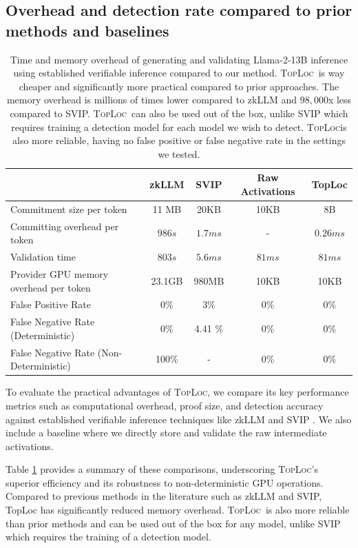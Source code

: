 \documentclass{article}
\theoremstyle{plain}
\theoremstyle{definition}
\theoremstyle{remark}
\newcommand{\toploc}{\textsc{TopLoc}}
\begin{document}
\subsection{Overhead and detection rate compared to prior methods and baselines}
\begin{table}[ht]
\caption{
Time and memory overhead of generating and validating Llama-2-13B inference using established verifiable inference compared to our method.
\toploc \ is way cheaper and significantly more practical compared to prior approaches.
The memory overhead is millions of times lower compared to zkLLM and $98,000$x less compared to SVIP.
\toploc \ can also be used out of the box, unlike SVIP which requires training a detection model for each model we wish to detect.
\toploc is also more reliable, having no false positive or false negative rate in the settings we tested.
}
\label{tab:comparisons}
\vskip 0.15in
\begin{center}
\begin{tabular}{lcccc}
 \toprule
  & zkLLM & SVIP & Raw Activations & TopLoc \\
 \midrule
 Commitment size per token & 11 MB & 20KB & 10KB & 8B \\ 
Committing overhead per token & $986s$ & $1.7ms$ & - & $0.26ms$ \\ 
Validation time & $803s$ & $5.6ms$ & $81ms$ & $81ms$\\ 
Provider GPU memory overhead per token & 23.1GB & 980MB & 10KB & 10KB\\ 
False Positive Rate & 0\% & 3\% & 0\% & 0\% \\
False Negative Rate (Deterministic) & 0\% & 4.41 \% & 0\% & 0\% \\ 
False Negative Rate (Non-Deterministic) & 100\% & - & 0\% & 0\% \\ 
\bottomrule
\end{tabular}
\end{center}
\end{table}

To evaluate the practical advantages of \toploc, we compare its key performance metrics such as computational overhead, proof size, and detection accuracy against established verifiable inference techniques like zkLLM \citep{zkllm} and SVIP \citep{svip}.
We also include a baseline where we directly store and validate the raw intermediate activations.

Table \ref{tab:comparisons} provides a summary of these comparisons, underscoring \toploc's superior efficiency and its robustness to non-deterministic GPU operations.
Compared to previous methods in the literature such as zkLLM and SVIP, TopLoc has significantly reduced memory overhead.
\toploc \ is also more reliable than prior methods and can be used out of the box for any model, unlike SVIP which requires the training of a detection model.
\end{document}
